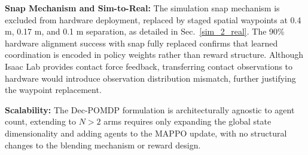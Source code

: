 \documentclass[lettersize,journal]{IEEEtran}
\begin{document}
\noindent\textbf{Snap Mechanism and Sim-to-Real:} The simulation snap mechanism is excluded from hardware deployment, replaced by staged spatial waypoints at 0.4 m, 0.17 m, and 0.1 m separation, as detailed in Sec.~\ref{sim_2_real}. The 90\% hardware alignment success with snap fully replaced confirms that learned coordination is encoded in policy weights rather than reward structure. Although Isaac Lab provides contact force feedback, transferring contact observations to hardware would introduce observation distribution mismatch, further justifying the waypoint replacement.

\noindent\textbf{Scalability:} The Dec-POMDP formulation is architecturally agnostic to agent count, extending to $N>2$ arms requires only expanding the global state dimensionality and adding agents to the MAPPO update, with no structural changes to the blending mechanism or reward design.
\end{document}

